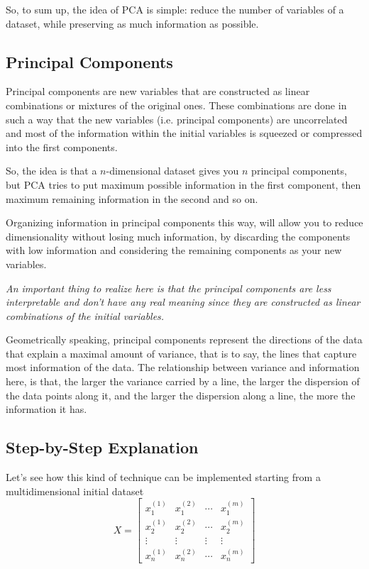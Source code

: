 So, to sum up, the idea of PCA is simple: reduce the number of variables of a dataset, while preserving as much information as possible.

\subsection{Principal Components}

Principal components are new variables that are constructed as linear combinations or mixtures of the original ones. These combinations are done in such a way that the new variables (i.e. principal components) are uncorrelated and most of the information within the initial variables is squeezed or compressed into the first components.

So, the idea is that a $n$-dimensional dataset gives you $n$ principal components, but PCA tries to put maximum possible information in the first component, then maximum remaining information in the second and so on.

Organizing information in principal components this way, will allow you to reduce dimensionality without losing much information, by discarding the components with low information and considering the remaining components as your new variables.

\emph{An important thing to realize here is that the principal components are less interpretable and don’t have any real meaning since they are constructed as linear combinations of the initial variables.}

Geometrically speaking, principal components represent the directions of the data that explain a maximal amount of variance, that is to say, the lines that capture most information of the data. The relationship between variance and information here, is that, the larger the variance carried by a line, the larger the dispersion of the data points along it, and the larger the dispersion along a line, the more the information it has.

\subsection{Step-by-Step Explanation}

Let's see how this kind of technique can be implemented starting from a multidimensional initial dataset
\begin{equation}
	X=\begin{bmatrix}
		x^{(1)}_1 &x^{(2)}_1&\cdots &x^{(m)}_1 \\
		x^{(1)}_2 &x^{(2)}_2&\cdots &x^{(m)}_2 \\
		\vdots &\vdots &\vdots &\vdots \\
		x^{(1)}_n &x^{(2)}_n&\cdots &x^{(m)}_n
	\end{bmatrix}
\end{equation}

